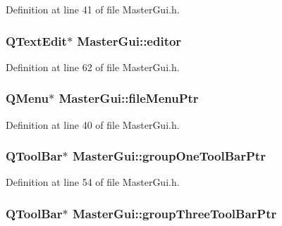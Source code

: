 Definition at line 41 of file Master\-Gui.\-h.

\hypertarget{class_master_gui_a0681f0b3d1828d84c0c0cd7e4d765d98}{
\subsubsection[{editor}]{\setlength{\rightskip}{0pt plus 5cm}Q\-Text\-Edit$\ast$ Master\-Gui\-::editor\hspace{0.3cm}{\ttfamily [private]}}}\label{class_master_gui_a0681f0b3d1828d84c0c0cd7e4d765d98}


Definition at line 62 of file Master\-Gui.\-h.

\hypertarget{class_master_gui_a1d768ad74ddb657928df8539c356abb6}{
\subsubsection[{file\-Menu\-Ptr}]{\setlength{\rightskip}{0pt plus 5cm}Q\-Menu$\ast$ Master\-Gui\-::file\-Menu\-Ptr\hspace{0.3cm}{\ttfamily [private]}}}\label{class_master_gui_a1d768ad74ddb657928df8539c356abb6}


Definition at line 40 of file Master\-Gui.\-h.

\hypertarget{class_master_gui_a67441e41e16e245976536f18cd7f2d6d}{
\subsubsection[{group\-One\-Tool\-Bar\-Ptr}]{\setlength{\rightskip}{0pt plus 5cm}Q\-Tool\-Bar$\ast$ Master\-Gui\-::group\-One\-Tool\-Bar\-Ptr\hspace{0.3cm}{\ttfamily [private]}}}\label{class_master_gui_a67441e41e16e245976536f18cd7f2d6d}


Definition at line 54 of file Master\-Gui.\-h.

\hypertarget{class_master_gui_af620c7fd8a0903c84581a657d23ef45b}{
\subsubsection[{group\-Three\-Tool\-Bar\-Ptr}]{\setlength{\rightskip}{0pt plus 5cm}Q\-Tool\-Bar$\ast$ Master\-Gui\-::group\-Three\-Tool\-Bar\-Ptr\hspace{0.3cm}{\ttfamily [private]}}}\label{class_master_gui_af620c7fd8a0903c84581a657d23ef45b}


